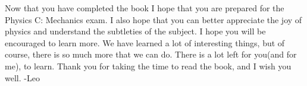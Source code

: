 Now that you have completed the book I hope that you are prepared for the Physics C: Mechanics exam. I also hope that you can better appreciate the joy of physics and understand the subtleties of the subject. I hope you will be encouraged to learn more. We have learned a lot of interesting things, but of course, there is so much more that we can do. There is a lot left for you(and for me), to learn. Thank you for taking the time to read the book, and I wish you well.
\newline
-Leo